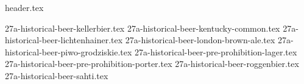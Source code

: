 \clearpage
{}
\divisorLine

{header.tex}

\begin{multicols}{2}

{27a-historical-beer-kellerbier.tex}
{27a-historical-beer-kentucky-common.tex}
{27a-historical-beer-lichtenhainer.tex}
{27a-historical-beer-london-brown-ale.tex}
{27a-historical-beer-piwo-grodziskie.tex}
{27a-historical-beer-pre-prohibition-lager.tex}
{27a-historical-beer-pre-prohibition-porter.tex}
{27a-historical-beer-roggenbier.tex}
{27a-historical-beer-sahti.tex}

\end{multicols}